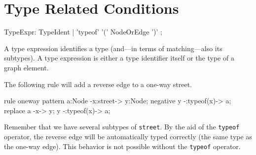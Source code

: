 \section{Type Related Conditions}
\label{typeexpressions}

\begin{rail}
  TypeExpr: TypeIdent | 'typeof' '(' NodeOrEdge ')' ;
\end{rail}
A type expression identifies a type (and---in terms of matching---also its subtypes). A type expression is either a type identifier itself or the type of a graph element.
\begin{example}
The following rule will add a reverse edge to a one-way street.
\begin{grgen}
rule oneway {
    pattern {
        a:Node -x:street-> y:Node;
        negative{
            y -:typeof(x)-> a;
        }
    } 
    replace {
        a -x-> y;
        y -:typeof(x)-> a;
    }
}
\end{grgen}
Remember that we have several subtypes of \texttt{street}. By the aid of the \texttt{typeof} operator, the reverse edge will be automatically typed correctly (the same type as the one-way edge). This behavior is not possible without the \texttt{typeof} operator.
\end{example}

